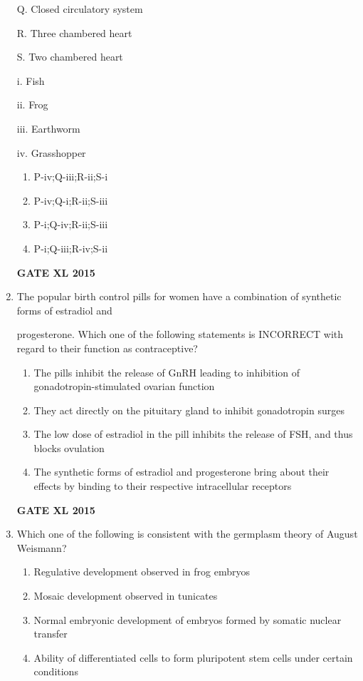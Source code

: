 \documentclass[journal,12pt,onecolumn]{IEEEtran}
\begin{document}
\begin{enumerate}
\begin{minipage}{0.5\textwidth}
\begin{flushleft}
Q. Closed circulatory system

R. Three chambered heart

S. Two chambered heart
	\end{flushleft}
	\end{minipage}
	\begin{minipage}{0.5\textwidth}\begin{flushleft}
		i. Fish

		ii. Frog

		iii. Earthworm

		iv. Grasshopper

	\end{flushleft}
	\end{minipage}



    \begin{enumerate}
            \item P-iv;Q-iii;R-ii;S-i
            \item P-iv;Q-i;R-ii;S-iii
            \item P-i;Q-iv;R-ii;S-iii
            \item P-i;Q-iii;R-iv;S-ii
    \end{enumerate}



\hfill{\textbf{GATE XL 2015}}
\item  The popular birth control pills for women have a combination of synthetic forms of estradiol and

progesterone. Which one of the following statements is INCORRECT with regard to their function as contraceptive?
    \begin{enumerate}
            \item  The pills inhibit the release of GnRH leading to inhibition of gonadotropin-stimulated ovarian function
	    \item  They act directly on the pituitary gland to inhibit gonadotropin surges
	    \item The low dose of estradiol in the pill inhibits the release of FSH, and thus blocks ovulation
            \item The synthetic forms of estradiol and progesterone bring about their effects by binding to their respective intracellular receptors
    \end{enumerate}


\hfill{\textbf{GATE XL 2015}}
\item Which one of the following is consistent with the germplasm theory of August Weismann?
    \begin{enumerate}
            \item Regulative development observed in frog embryos
	    \item Mosaic development observed in tunicates
	    \item Normal embryonic development of embryos formed by somatic nuclear transfer
            \item Ability of differentiated cells to form pluripotent stem cells under certain conditions
    \end{enumerate}




\end{enumerate}
\end{document}
